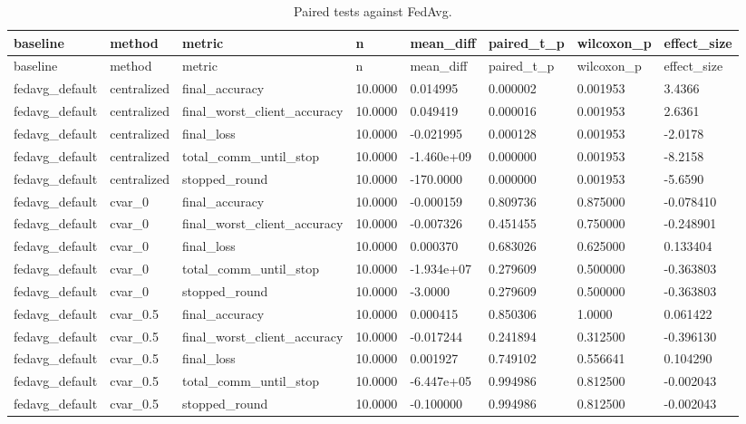 \documentclass[11pt]{report}
\begin{document}
\begin{longtable}{llllllll}
\caption{Paired tests against FedAvg.}\\
\toprule
baseline & method & metric & n & mean\_diff & paired\_t\_p & wilcoxon\_p & effect\_size \\
\midrule
\endfirsthead
\toprule
baseline & method & metric & n & mean\_diff & paired\_t\_p & wilcoxon\_p & effect\_size \\
\midrule
\endhead
fedavg\_default & centralized & final\_accuracy & 10.0000 & 0.014995 & 0.000002 & 0.001953 & 3.4366 \\
fedavg\_default & centralized & final\_worst\_client\_accuracy & 10.0000 & 0.049419 & 0.000016 & 0.001953 & 2.6361 \\
fedavg\_default & centralized & final\_loss & 10.0000 & -0.021995 & 0.000128 & 0.001953 & -2.0178 \\
fedavg\_default & centralized & total\_comm\_until\_stop & 10.0000 & -1.460e+09 & 0.000000 & 0.001953 & -8.2158 \\
fedavg\_default & centralized & stopped\_round & 10.0000 & -170.0000 & 0.000000 & 0.001953 & -5.6590 \\
fedavg\_default & cvar\_0 & final\_accuracy & 10.0000 & -0.000159 & 0.809736 & 0.875000 & -0.078410 \\
fedavg\_default & cvar\_0 & final\_worst\_client\_accuracy & 10.0000 & -0.007326 & 0.451455 & 0.750000 & -0.248901 \\
fedavg\_default & cvar\_0 & final\_loss & 10.0000 & 0.000370 & 0.683026 & 0.625000 & 0.133404 \\
fedavg\_default & cvar\_0 & total\_comm\_until\_stop & 10.0000 & -1.934e+07 & 0.279609 & 0.500000 & -0.363803 \\
fedavg\_default & cvar\_0 & stopped\_round & 10.0000 & -3.0000 & 0.279609 & 0.500000 & -0.363803 \\
fedavg\_default & cvar\_0.5 & final\_accuracy & 10.0000 & 0.000415 & 0.850306 & 1.0000 & 0.061422 \\
fedavg\_default & cvar\_0.5 & final\_worst\_client\_accuracy & 10.0000 & -0.017244 & 0.241894 & 0.312500 & -0.396130 \\
fedavg\_default & cvar\_0.5 & final\_loss & 10.0000 & 0.001927 & 0.749102 & 0.556641 & 0.104290 \\
fedavg\_default & cvar\_0.5 & total\_comm\_until\_stop & 10.0000 & -6.447e+05 & 0.994986 & 0.812500 & -0.002043 \\
fedavg\_default & cvar\_0.5 & stopped\_round & 10.0000 & -0.100000 & 0.994986 & 0.812500 & -0.002043 \\

\end{longtable}
\end{document}
